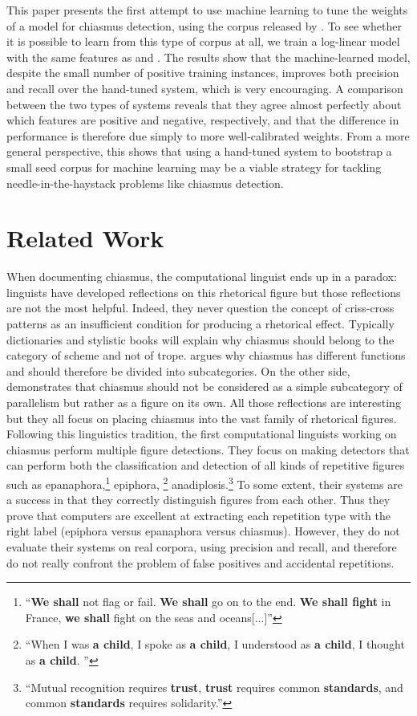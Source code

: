 \documentclass[11pt]{article}
\newcommand{\mn}[1]{\textbf{#1}}
\begin{document}
This paper presents the first attempt to use machine learning to tune the weights of a model for chiasmus detection, using the corpus released by . To see whether it is possible to learn from this type of corpus at all, we train a log-linear model with the same features as  and . The results show that the machine-learned model, despite the small number of positive training instances, improves both precision and recall over the hand-tuned system, which is very encouraging. A comparison between the two types of systems reveals that they agree almost perfectly about which features are positive and negative, respectively, and that the difference in performance is therefore due simply to more well-calibrated weights. From a more general perspective, this shows that using a hand-tuned system to bootstrap a small seed corpus for machine learning may be a viable strategy for tackling needle-in-the-haystack problems like chiasmus detection. 

\section{Related Work}

\label{stateof}
When documenting chiasmus, the computational linguist ends up in a paradox: linguists have developed reflections on this rhetorical figure but those reflections are not the most helpful. Indeed, they never question the concept of criss-cross patterns as an insufficient condition for producing a rhetorical effect. Typically dictionaries and stylistic books \cite{font,gradus} will explain why chiasmus should belong to the category of scheme and not of trope.  argues why chiasmus has different functions and should therefore be divided into subcategories. On the other side,  demonstrates that chiasmus should not be considered as a simple subcategory of parallelism but rather as a figure on its own. All those reflections are interesting but they all focus on placing chiasmus into the vast family of rhetorical figures. 
Following this linguistics tradition, the first computational linguists \cite{gawr,hromada} working on chiasmus perform multiple figure detections. They focus on making detectors that can perform both the classification and detection of all kinds of repetitive figures such as epanaphora,\footnote{``\mn{We shall} not flag or fail. \mn{We shall} go on to the end. \mn{We shall fight} in France, \mn{we shall} fight on the seas and oceans[...]''} epiphora, \footnote{``When I was \mn{a child}, I spoke as \mn{a child}, I understood as \mn{a child}, I thought as \mn{a child}. ''} anadiplosis.\footnote{``Mutual recognition requires \mn{trust}, \mn{trust} requires common \mn{standards}, and common \mn{standards} requires solidarity.''} To some extent, their systems are a success in that they correctly distinguish figures from each other. Thus they prove that computers are excellent at extracting each repetition type with the right label (epiphora versus epanaphora versus chiasmus). However, they do not evaluate their systems on real corpora, using precision and recall, and therefore do not really confront the problem of false positives and accidental repetitions.
\end{document}
